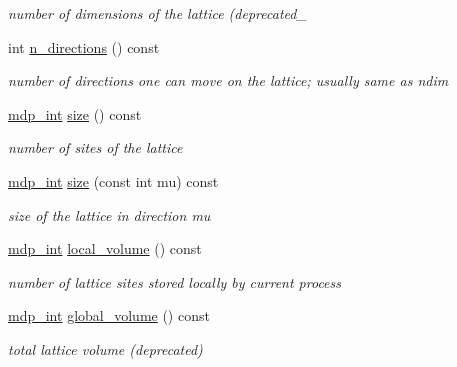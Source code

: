 \begin{DoxyCompactItemize}
\begin{DoxyCompactList}\small\item\em number of dimensions of the lattice (deprecated\_\- \item\end{DoxyCompactList}\item 
int \hyperlink{classmdp__lattice_aa8452324840f85cf188ce7fffe488d98}{n\_\-directions} () const 
\begin{DoxyCompactList}\small\item\em number of directions one can move on the lattice; usually same as ndim \item\end{DoxyCompactList}\item 
\hyperlink{mdp__global__vars_8h_aaa1ad9d0dcd2124aa5af0120d9954174}{mdp\_\-int} \hyperlink{classmdp__lattice_a903ec2c7d662743f8bc1e311d21f6c21}{size} () const 
\begin{DoxyCompactList}\small\item\em number of sites of the lattice \item\end{DoxyCompactList}\item 
\hyperlink{mdp__global__vars_8h_aaa1ad9d0dcd2124aa5af0120d9954174}{mdp\_\-int} \hyperlink{classmdp__lattice_a08612798e2f61d4e9d2ccdc8b8d7cf37}{size} (const int mu) const 
\begin{DoxyCompactList}\small\item\em size of the lattice in direction mu \item\end{DoxyCompactList}\item 
\hyperlink{mdp__global__vars_8h_aaa1ad9d0dcd2124aa5af0120d9954174}{mdp\_\-int} \hyperlink{classmdp__lattice_acc39e2cd011b6ebc5cc527fbdfc03ec6}{local\_\-volume} () const 
\begin{DoxyCompactList}\small\item\em number of lattice sites stored locally by current process \item\end{DoxyCompactList}\item 
\hyperlink{mdp__global__vars_8h_aaa1ad9d0dcd2124aa5af0120d9954174}{mdp\_\-int} \hyperlink{classmdp__lattice_ac1adc4b64acbf07588b58dd0de4dc021}{global\_\-volume} () const 
\begin{DoxyCompactList}\small\item\em total lattice volume (deprecated) \item\end{DoxyCompactList}\item 

\end{DoxyCompactItemize}
